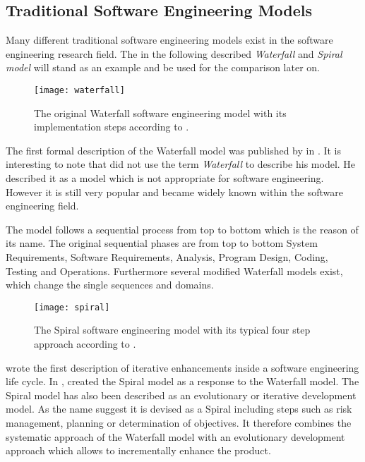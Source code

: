 \subsection{Traditional Software Engineering Models} %

Many different traditional software engineering models exist in the software
engineering research field. The in the following described \emph{Waterfall} and
\emph{Spiral model} will stand as an example and be used for the comparison
later on.

\begin{figure}[htbp]
  \centering
  \texttt{[image: waterfall]}
  \caption[Original Waterfall Model]
  {The original Waterfall software engineering model with its implementation
    steps according to \textcite{Royce1970}.}
\end{figure}

The first formal description of the Waterfall model was published by
\textcite{Royce1970} in \citeyear{Royce1970}. It is interesting to note that
\citeauthor{Royce1970} did not use the term \emph{Waterfall} to describe his
model. He described it as a model which is not appropriate for software
engineering. However it is still very popular and became widely known within
the software engineering field.

The model follows a sequential process from top to bottom which is the reason
of its name. The original sequential phases are from top to bottom System
Requirements, Software Requirements, Analysis, Program Design, Coding, Testing
and Operations. Furthermore several modified Waterfall models exist, which
change the single sequences and domains.

\begin{figure}[htbp]
  \centering
  \texttt{[image: spiral]}
  \caption[Spiral Model]
  {The Spiral software engineering model with its typical four step approach
    according to \textcite{Boehm1988}.}
\end{figure}

\textcite{Basili1975} wrote the first description of iterative enhancements
inside a software engineering life cycle. In \citeyear{Boehm1988},
\textcite{Boehm1988} created the Spiral model as a response to the Waterfall
model. The Spiral model has also been described as an evolutionary or iterative
development model. As the name suggest it is devised as a Spiral including
steps such as risk management, planning or determination of objectives. It
therefore combines the systematic approach of the Waterfall model with an
evolutionary development approach which allows to incrementally enhance the
product.

